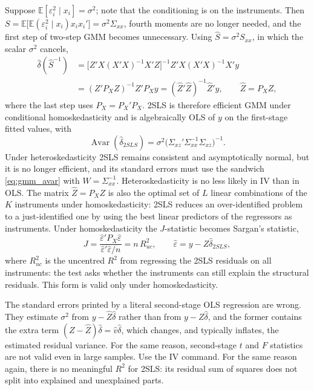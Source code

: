 \documentclass[11pt,a4paper]{article}
\newcommand{\E}{\mathbb{E}}
\newcommand{\Avar}{\operatorname{Avar}}
\newcommand{\dhat}{\hat\delta}
\newcommand{\Sxx}{S_{xx}}
\newcommand{\sxx}{\Sigma_{xx}}
\newcommand{\sxz}{\Sigma_{xz}}
\begin{document}
Suppose $\E[\varepsilon_i^2\mid x_i]=\sigma^2$; note that the conditioning is on the instruments. Then $S=\E\big[\E(\varepsilon_i^2\mid x_i)x_ix_i'\big]=\sigma^2\sxx$, fourth moments are no longer needed, and the first step of two-step GMM becomes unnecessary. Using $\hat S=\sigma^2\Sxx$, in which the scalar $\sigma^2$ cancels,
\begin{align*}
\dhat(\hat S^{-1})&=\big[Z'X(X'X)^{-1}X'Z\big]^{-1}Z'X(X'X)^{-1}X'y\\
&=(Z'P_XZ)^{-1}Z'P_Xy=(\hat Z'\hat Z)^{-1}\hat Z'y,\qquad\hat Z=P_XZ,
\end{align*}
where the last step uses $P_X=P_X'P_X$. 2SLS is therefore efficient GMM under conditional homoskedasticity and is algebraically OLS of $y$ on the first-stage fitted values, with
\[
\Avar(\dhat_{2SLS})=\sigma^2\big(\sxz'\sxx^{-1}\sxz\big)^{-1}.
\]
Under heteroskedasticity 2SLS remains consistent and asymptotically normal, but it is no longer efficient, and its standard errors must use the sandwich \eqref{eq:gmm_avar} with $W=\sxx^{-1}$. Heteroskedasticity is no less likely in IV than in OLS. The matrix $\hat Z=P_XZ$ is also the optimal set of $L$ linear combinations of the $K$ instruments under homoskedasticity: 2SLS reduces an over-identified problem to a just-identified one by using the best linear predictors of the regressors as instruments. Under homoskedasticity the $J$-statistic becomes Sargan's statistic,
\[
J=\frac{\hat\varepsilon'P_X\hat\varepsilon}{\hat\varepsilon'\hat\varepsilon/n}=n\,R^2_{uc},\qquad\hat\varepsilon=y-Z\dhat_{2SLS},
\]
where $R^2_{uc}$ is the uncentred $R^2$ from regressing the 2SLS residuals on all instruments: the test asks whether the instruments can still explain the structural residuals. This form is valid only under homoskedasticity.

The standard errors printed by a literal second-stage OLS regression are wrong. They estimate $\sigma^2$ from $y-\hat Z\dhat$ rather than from $y-Z\dhat$, and the former contains the extra term $(Z-\hat Z)\dhat=\hat v\dhat$, which changes, and typically inflates, the estimated residual variance. For the same reason, second-stage $t$ and $F$ statistics are not valid even in large samples. Use the IV command. For the same reason again, there is no meaningful $R^2$ for 2SLS: its residual sum of squares does not split into explained and unexplained parts.
\end{document}
